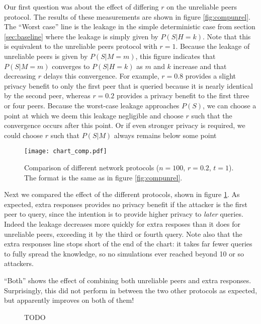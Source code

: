 \documentclass{article}
\newcommand{\secref}[1]{section \ref{sec:#1}}
\newcommand{\figref}[1]{figure \ref{fig:#1}}
\begin{document}
Our first question was about the effect of differing $r$ on the unreliable peers
protocol. The results of these measurements are shown in \figref{compunrel}.
The ``Worst case'' line is the leakage in the simple deterministic case from
\secref{baseline} where the leakage is simply given by $P(S|H=k)$. Note that
this is equivalent to the unreliable peers protocol with $r=1$. Because the
leakage of unreliable peers is given by $P(S|M=m)$, this figure
indicates that $P(S|M=m)$ converges to $P(S|H=k)$ as $m$ and $k$ increase and
that decreasing $r$ delays this convergence. For example, $r=0.8$ provides a
slight privacy benefit to only the first peer that is queried because it is nearly identical
by the second peer, whereas $r=0.2$ provides a privacy benefit to the first
three or four peers. Because the worst-case leakage approaches $P(S)$, we can
choose a point at which we deem this leakage negligible and choose $r$ such that
the convergence occurs after this point. Or if even stronger privacy is
required, we could choose $r$ such that $P(S|M)$ always remains below some point


\begin{figure}%
    \centering
	\texttt{[image: chart\_comp.pdf]}
	\caption{Comparison of different network protocols ($n=100$, $r=0.2$, $t=1$).
	The format is the same as in \figref{compunrel}.}
    \label{fig:comp}%
\end{figure}

Next we compared the effect of the different protocols, shown in \figref{comp}.
As expected, extra responses provides no privacy benefit if the attacker is the
first peer to query, since the intention is to provide higher privacy to {\it
later} queries. Indeed the leakage decreases more quickly for extra
resposes than it does for unreliable peers, exceeding it by the third or fourth
query. Note also that the extra responses line stops short of the end of the
chart: it takes far fewer queries to fully spread the knowledge, so no
simulations ever reached beyond 10 or so attackers.

``Both'' shows the effect of combining both unreliable peers and extra
responses. Surprisingly, this did not perform in between the two other protocols
as expected, but apparently improves on both of them!

\begin{figure}%
    \centering
	\caption{TODO}
    \label{fig:exdist}%
\end{figure}
\end{document}
